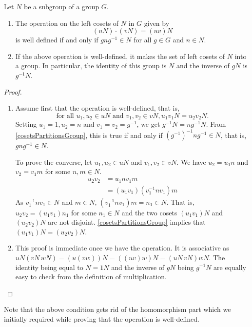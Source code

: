 \begin{theorem}
\label{cosetOperationMakesSenseIffNormal}
    Let $N$ be a subgroup of a group $G$.
    \begin{enumerate}
        \item The operation on the left cosets of $N$ in $G$ given by
        $$(uN)\cdot(vN)=(uv)N$$
        is well defined if and only if $gng^{-1}\in N$ for all $g\in G$ and $n\in N$.
        \item If the above operation is well-defined, it makes the set of left cosets of $N$ into a group. In particular, the identity of this group is $N$ and the inverse of $gN$ is $g^{-1}N$.
    \end{enumerate}
\end{theorem}
\begin{proof}
    \phantom{owo}
    \begin{enumerate}
        \item Assume first that the operation is well-defined, that is,
        $$\text{for all }u_1,u_2\in uN\text{ and }v_1,v_2\in vN, u_1v_1N=u_2v_2N.$$
        Setting $u_1=1,u_2=n$ and $v_1=v_2=g^{-1}$, we get
        $g^{-1}N=ng^{-1}N$. From \ref{cosetsPartitionsGroup}, this is true if and only if $(g^{-1})^{-1}ng^{-1}\in N$, that is, $gng^{-1}\in N$.
        
        To prove the converse, let $u_1,u_2\in uN$ and $v_1,v_2\in vN$. We have $u_2=u_1n$ and $v_2=v_1m$ for some $n,m\in N$.
        \begin{align*}
            u_2v_2 &= u_1nv_1m \\
                   &= (u_1v_1)(v_1^{-1}nv_1)m
        \end{align*}
        As $v_1^{-1}nv_1\in N$ and $m\in N$, $(v_1^{-1}nv_1)m=n_1\in N$. That is, $u_2v_2=(u_1v_1)n_1$ for some $n_1\in N$ and the two cosets $(u_1v_1)N$ and $(u_2v_2)N$ are not disjoint. \ref{cosetsPartitionsGroup} implies that $(u_1v_1)N=(u_2v_2)N$.
        \item This proof is immediate once we have the operation. It is associative as $uN(vN\,wN)=(u(vw))N=((uv)w)N=(uN\,vN)wN$. The identity being equal to $N=1N$ and the inverse of $gN$ being $g^{-1}N$ are equally easy to check from the definition of multiplication.
    \end{enumerate}
\end{proof}

Note that the above condition gets rid of the homomorphism part which we initially required while proving that the operation is well-defined.

